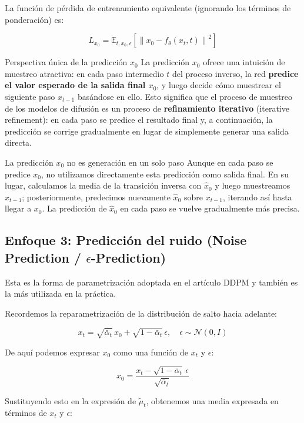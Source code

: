 \documentclass[a4paper]{article}
\begin{document}
La función de pérdida de entrenamiento equivalente (ignorando los términos de ponderación) es:

$$L_{x_0} = \mathbb{E}_{t, x_0, \epsilon}\left[\left\| x_0 - f_\theta(x_t, t) \right\|^2\right]$$

\begin{importantbox}{Perspectiva única de la predicción $x_0$}
La predicción $x_0$ ofrece una intuición de muestreo atractiva: en cada paso intermedio $t$ del proceso inverso, la red \textbf{predice el valor esperado de la salida final $x_0$}, y luego decide cómo muestrear el siguiente paso $x_{t-1}$ basándose en ello. Esto significa que el proceso de muestreo de los modelos de difusión es un proceso de \textbf{refinamiento iterativo} (iterative refinement): en cada paso se predice el resultado final y, a continuación, la predicción se corrige gradualmente en lugar de simplemente generar una salida directa.
\end{importantbox}

\begin{warningbox}{La predicción $x_0$ no es generación en un solo paso}
Aunque en cada paso se predice $x_0$, no utilizamos directamente esta predicción como salida final. En su lugar, calculamos la media de la transición inversa con $\hat{x}_0$ y luego muestreamos $x_{t-1}$; posteriormente, predecimos nuevamente $\hat{x}_0$ sobre $x_{t-1}$, iterando así hasta llegar a $x_0$. La predicción de $\hat{x}_0$ en cada paso se vuelve gradualmente más precisa.
\end{warningbox}

\subsection{Enfoque 3: Predicción del ruido (Noise Prediction / $\epsilon$-Prediction)}

Esta es la forma de parametrización adoptada en el artículo DDPM y también es la más utilizada en la práctica.

Recordemos la reparametrización de la distribución de salto hacia adelante:

$$x_t = \sqrt{\bar{\alpha}_t}\, x_0 + \sqrt{1 - \bar{\alpha}_t}\, \epsilon, \quad \epsilon \sim \mathcal{N}(0, I)$$

De aquí podemos expresar $x_0$ como una función de $x_t$ y $\epsilon$:

$$x_0 = \frac{x_t - \sqrt{1 - \bar{\alpha}_t}\, \epsilon}{\sqrt{\bar{\alpha}_t}}$$

Sustituyendo esto en la expresión de $\tilde{\mu}_t$, obtenemos una media expresada en términos de $x_t$ y $\epsilon$:
\end{document}
